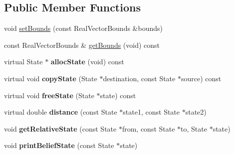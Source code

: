 \subsection*{\-Public \-Member \-Functions}
\begin{DoxyCompactItemize}
\item 
void \hyperlink{class_s_e2_belief_space_a5802f054e3cbb060fd96a42398d4ff6d}{set\-Bounds} (const \-Real\-Vector\-Bounds \&bounds)
\item 
const \-Real\-Vector\-Bounds \& \hyperlink{class_s_e2_belief_space_a05aba6731aec5046e99df18c7c8603f0}{get\-Bounds} (void) const 
\item 
\hypertarget{class_s_e2_belief_space_a58efacef9a9413925bd48d0da71b7886}{virtual \-State $\ast$ {\bfseries alloc\-State} (void) const }\label{class_s_e2_belief_space_a58efacef9a9413925bd48d0da71b7886}

\item 
\hypertarget{class_s_e2_belief_space_a64eeb0fb62f8ed174c95604e22b759cd}{virtual void {\bfseries copy\-State} (\-State $\ast$destination, const \-State $\ast$source) const }\label{class_s_e2_belief_space_a64eeb0fb62f8ed174c95604e22b759cd}

\item 
\hypertarget{class_s_e2_belief_space_a0dedcfe61f35ab4eed2f997615856a89}{virtual void {\bfseries free\-State} (\-State $\ast$state) const }\label{class_s_e2_belief_space_a0dedcfe61f35ab4eed2f997615856a89}

\item 
\hypertarget{class_s_e2_belief_space_a96f20d1a29f25fddbabe0c56ff408006}{virtual double {\bfseries distance} (const \-State $\ast$state1, const \-State $\ast$state2)}\label{class_s_e2_belief_space_a96f20d1a29f25fddbabe0c56ff408006}

\item 
\hypertarget{class_s_e2_belief_space_a6d840d9e02dfd15b410e4671a7e94623}{void {\bfseries get\-Relative\-State} (const \-State $\ast$from, const \-State $\ast$to, \-State $\ast$state)}\label{class_s_e2_belief_space_a6d840d9e02dfd15b410e4671a7e94623}

\item 
\hypertarget{class_s_e2_belief_space_a6efc6e19ffd078fe38ede1c2120bea2f}{void {\bfseries print\-Belief\-State} (const \-State $\ast$state)}\label{class_s_e2_belief_space_a6efc6e19ffd078fe38ede1c2120bea2f}

\end{DoxyCompactItemize}


